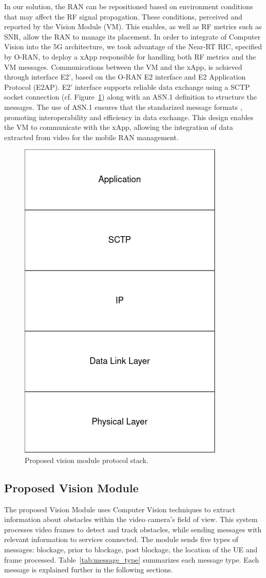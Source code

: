 In our solution, the RAN can be repositioned based on environment conditions that may affect the RF signal propagation\@.
These conditions, perceived and reported by the Vision Module (VM).
This enables, as well as RF metrics such as SNR, allow the RAN to manage its placement.
In order to integrate of Computer Vision into the 5G architecture, we took advantage of the Near-RT RIC, specified by O-RAN, to deploy a xApp responsible for handling both RF metrics and the VM messages.
Communications between the VM and the xApp, is achieved through interface E2', based on the O-RAN E2 interface and E2 Application Protocol (E2AP).
E2' interface supports reliable data exchange using a SCTP socket connection (cf.
Figure~\ref{fig:stack}) along with an ASN.1 definition to structure the messages.
The use of ASN.1 ensures that the standarized message formats , promoting interoperability and efficiency in data exchange.
This design enables the VM to communicate with the xApp, allowing the integration of data extracted from video for the mobile RAN management.

\begin{figure}[H]
    \centering
    \includegraphics[width=0.2\linewidth]{figures/VisionModule_ProtocolStack.drawio(2)}
    \caption[Proposed Vision Module Protocol Stack]{Proposed vision module protocol stack.}
    \label{fig:stack}
\end{figure}


\subsection{Proposed Vision Module}\label{subsec:prop_vision}
The proposed Vision Module uses Computer Vision techniques to extract information about obstacles within the video camera's field of view.
This system processes video frames to detect and track obstacles, while sending messages with relevant information to services connected.
The module sends five types of messages: blockage, prior to blockage, post blockage, the location of the UE and frame processed.
Table~\ref{tab:message_type} summarizes each message type.
Each message is explained further in the following sections.


